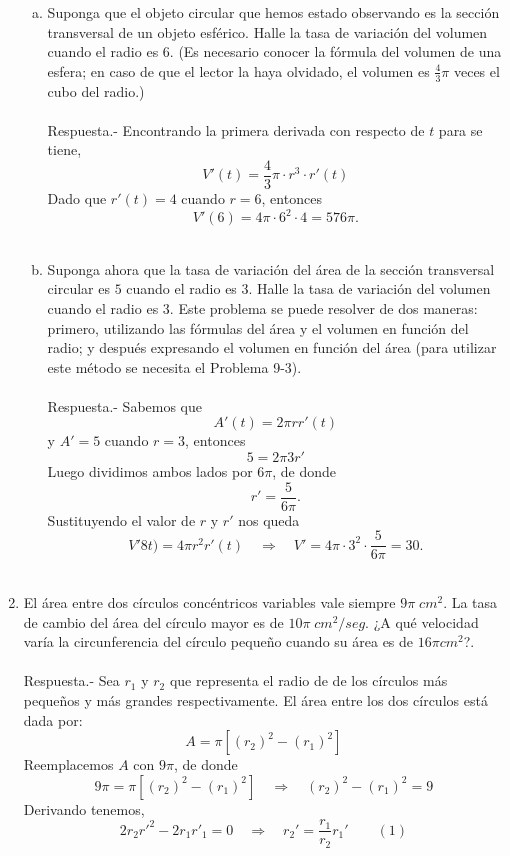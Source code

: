\begin{enumerate}[\bfseries 1.]
\begin{enumerate}[(a)]
	    \item Suponga que el objeto circular que hemos estado observando es la sección transversal de un objeto esférico. Halle la tasa de variación del volumen cuando el radio es $6$. (Es necesario conocer la fórmula del volumen de una esfera; en caso de que el lector la haya olvidado, el volumen es $\frac{4}{3}\pi$ veces el cubo del radio.)\\\\
		Respuesta.-\; Encontrando la primera derivada con respecto de $t$ para se tiene,
		$$V'(t)=\frac{4}{3}\pi\cdot r^3 \cdot r'(t)$$
		Dado que $r'(t)=4$ cuando $r=6$, entonces
		$$V'(6)=4\pi\cdot 6^2 \cdot 4 = 576\pi.$$\\

	    \item Suponga ahora que la tasa de variación del área de la sección transversal circular es $5$ cuando el radio es $3$. Halle la tasa de variación del volumen cuando el radio es $3$. Este problema se puede resolver de dos maneras: primero, utilizando las fórmulas del área y el volumen en función del radio; y después expresando el volumen en función del área (para utilizar este método se necesita el Problema 9-3).\\\\
		Respuesta.-\; Sabemos que 
		$$A'(t)=2\pi r r'(t)$$
		y $A'=5$ cuando $r=3$, entonces
		$$5=2\pi 3r'$$
		Luego dividimos ambos lados por $6\pi$, de donde
		$$r'=\dfrac{5}{6\pi}.$$
		Sustituyendo el valor de $r$ y $r'$ nos queda
		$$V'8t)=4\pi r^2 r'(t)\quad \Rightarrow \quad V'=4\pi\cdot 3^2 \cdot \dfrac{5}{6\pi}=30.$$\\

	\end{enumerate}

    \item El área entre dos círculos concéntricos variables vale siempre $9\pi\; cm^2$. La tasa de cambio del área del círculo mayor es de $10\pi\; cm^2/seg$. ¿A qué velocidad varía la circunferencia del círculo pequeño cuando su área es de $16\pi cm^2$?.\\\\
	Respuesta.-\; Sea $r_1$ y $r_2$ que representa el radio de de los círculos más pequeños y más grandes respectivamente. El área entre los dos círculos está dada por:
	$$A=\pi\left[(r_2)^2-(r_1)^2\right]$$
	Reemplacemos $A$ con $9\pi$, de donde 
	$$9\pi = \pi\left[(r_2)^2-(r_1)^2\right] \quad \Rightarrow \quad (r_2)^2-(r_1)^2=9$$
	Derivando tenemos,
	$$2r_2r'^2 - 2r_1r'_1 = 0\quad \Rightarrow \quad r_2'=\dfrac{r_1}{r_2}r_1'\qquad (1)$$


\end{enumerate}
